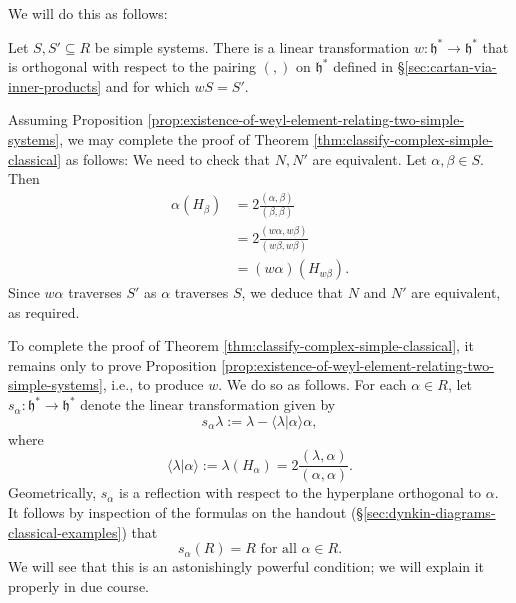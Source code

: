 \documentclass[reqno]{amsart} 
\begin{document}
We will do this as follows:
\begin{proposition}\label{prop:existence-of-weyl-element-relating-two-simple-systems}
  Let $S, S' \subseteq R$ be simple systems.  There is a linear transformation $w : \mathfrak{h}^* \rightarrow \mathfrak{h}^*$ that is orthogonal with respect to the pairing $(,)$ on $\mathfrak{h}^*$ defined in \S\ref{sec:cartan-via-inner-products} and for which $w S = S'$.
\end{proposition}
Assuming Proposition \ref{prop:existence-of-weyl-element-relating-two-simple-systems}, we may complete the proof of Theorem \ref{thm:classify-complex-simple-classical} as follows: We need to check that $N, N'$ are equivalent.  Let $\alpha , \beta \in S$.  Then
\begin{align*}
  \alpha(H_\beta)
  &=
    2 \frac{(\alpha,\beta)}{(\beta,\beta)}
  \\
  &=
    2 \frac{(w \alpha,w \beta)}{(w \beta,w\beta)}
  \\
  &=
    (w \alpha)(H_{w \beta}).
\end{align*}
Since $w \alpha$ traverses $S'$ as $\alpha$ traverses $S$, we deduce that $N$ and $N'$ are equivalent, as required.

To complete the proof of Theorem \ref{thm:classify-complex-simple-classical}, it remains only to prove Proposition \ref{prop:existence-of-weyl-element-relating-two-simple-systems}, i.e., to produce $w$.  We do so as follows.  For each $\alpha \in R$, let $s_\alpha : \mathfrak{h}^* \rightarrow \mathfrak{h}^*$ denote the linear transformation given by
\begin{equation*}
  s_\alpha \lambda := \lambda - \langle \lambda|\alpha \rangle \alpha,
\end{equation*}
where
\begin{equation*}
  \langle \lambda|\alpha \rangle := \lambda(H_\alpha) = 2 \frac{(\lambda,\alpha)}{(\alpha,\alpha)}.
\end{equation*}
Geometrically, $s_\alpha$ is a reflection with respect to the hyperplane orthogonal to $\alpha$.  It follows by inspection of the formulas on the handout (\S\ref{sec:dynkin-diagrams-classical-examples}) that
\begin{equation}\label{eq:root-reflections-preserve-roots}
  s_\alpha(R) = R
  \text{ for all } \alpha \in R.
\end{equation}
We will see that this is an astonishingly powerful condition; we will explain it properly in due course.
\end{document}
